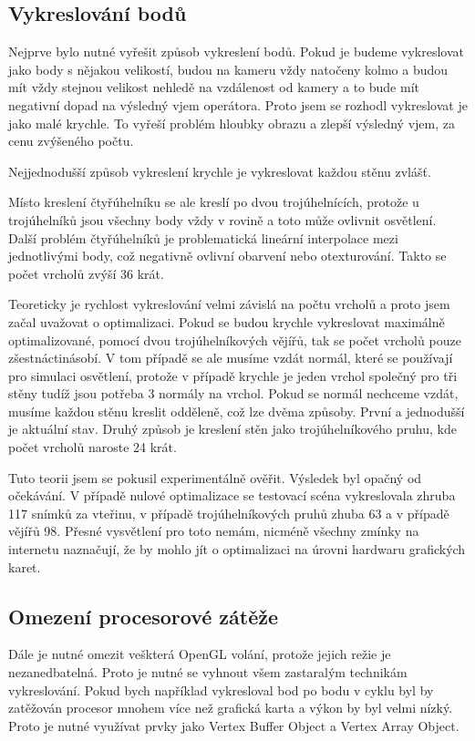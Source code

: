 \subsection{Vykreslování bodů}

Nejprve bylo nutné vyřešit způsob vykreslení bodů. Pokud je budeme vykreslovat jako body s nějakou velikostí, budou na kameru vždy natočeny kolmo a budou mít vždy stejnou velikost nehledě na vzdálenost od kamery a to bude mít negativní dopad na výsledný vjem operátora. Proto jsem se rozhodl vykreslovat je jako malé krychle. To vyřeší problém hloubky obrazu a zlepší výsledný vjem, za cenu zvýšeného počtu.

Nejjednodušší způsob vykreslení krychle je vykreslovat každou stěnu zvlášť.

Místo kreslení čtyřúhelníku se ale kreslí po dvou trojúhelnících, protože u trojúhelníků jsou všechny body vždy v rovině a toto může ovlivnit osvětlení. Další problém čtyřúhelníků je problematická lineární interpolace mezi jednotlivými body, což negativně ovlivní obarvení nebo otexturování. Takto se počet vrcholů zvýší 36 krát.

Teoreticky je rychlost vykreslování velmi závislá na počtu vrcholů a proto jsem začal uvažovat o optimalizaci. Pokud se budou krychle vykreslovat maximálně optimalizované, pomocí dvou trojúhelníkových vějířů, tak se počet vrcholů pouze zšestnáctinásobí. V tom případě se ale musíme vzdát normál, které se používají pro simulaci osvětlení, protože v případě krychle je jeden vrchol společný pro tři stěny tudíž jsou potřeba 3 normály na vrchol. Pokud se normál nechceme vzdát, musíme každou stěnu kreslit odděleně, což lze dvěma způsoby. První a jednodušší je aktuální stav. Druhý způsob je kreslení stěn jako trojúhelníkového pruhu, kde počet vrcholů naroste 24 krát.

Tuto teorii jsem se pokusil experimentálně ověřit. Výsledek byl opačný od očekávání. V případě nulové optimalizace se testovací scéna vykreslovala zhruba 117 snímků za vteřinu, v případě trojúhelníkových pruhů zhuba 63 a v případě vějířů 98. Přesné vysvětlení pro toto nemám, nicméně všechny zmínky na internetu naznačují\cite{tri_opt_1}\cite{tri_opt_2}, že by mohlo jít o optimalizaci na úrovni hardwaru grafických karet.

\subsection{Omezení procesorové zátěže}

Dále je nutné omezit veškterá OpenGL volání, protože jejich režie je nezanedbatelná. Proto je nutné se vyhnout všem zastaralým technikám vykreslování. Pokud bych například vykresloval bod po bodu v cyklu byl by zatěžován procesor mnohem více než grafická karta a výkon by byl velmi nízký. Proto je nutné využívat prvky jako Vertex Buffer Object\cite{vbo} a Vertex Array Object\cite{vao}.

